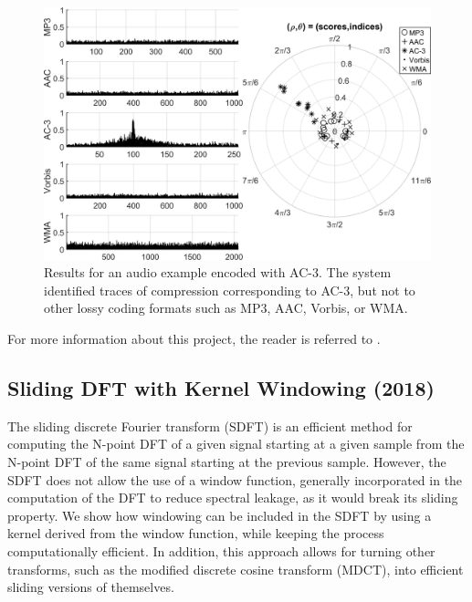 \documentclass{article}
\begin{document}
\begin{figure}[!htb]
\centering
\includegraphics[width=\columnwidth]{Images/compression.png}
\caption{Results for an audio example encoded with AC-3. The system identified traces of compression corresponding to AC-3, but not to other lossy coding formats such as MP3, AAC, Vorbis, or WMA.}
\label{fig:compression}
\end{figure}

For more information about this project, the reader is referred to \cite{inproceedings_kim_sep2018}.


\subsection{Sliding DFT with Kernel Windowing (2018)}
\label{ssec:sdft}

The sliding discrete Fourier transform (SDFT) is an efficient method for computing the N-point DFT of a given signal starting at a given sample from the N-point DFT of the same signal starting at the previous sample. However, the SDFT does not allow the use of a window function, generally incorporated in the computation of the DFT to reduce spectral leakage, as it would break its sliding property. We show how windowing can be included in the SDFT by using a kernel derived from the window function, while keeping the process computationally efficient. In addition, this approach allows for turning other transforms, such as the modified discrete cosine transform (MDCT), into efficient sliding versions of themselves.
\end{document}
